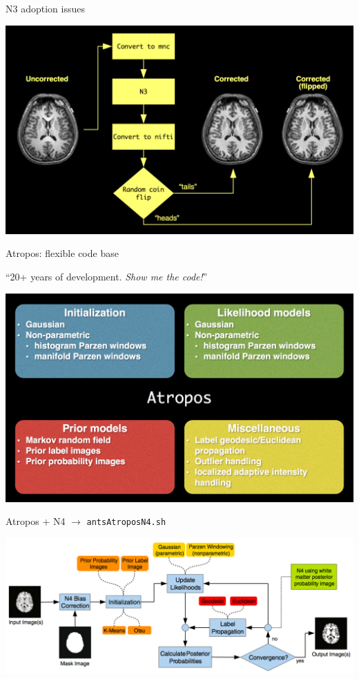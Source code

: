 \documentclass[ignorenonframetext,]{beamer}
\begin{document}
\begin{frame}{N3 adoption issues}

\includegraphics{./tools/n4/figures/whyN4.png}

\end{frame}

\begin{frame}{Atropos: flexible code base}

``20+ years of development. \emph{Show me the code!}''

\includegraphics{./tools/atropos/figures/atropos.png}

\end{frame}

\begin{frame}{Atropos + N4 \(\rightarrow\) \texttt{antsAtroposN4.sh}}

\includegraphics{./tools/atropos/figures/atroposFlow.png}

\end{frame}
\end{document}
